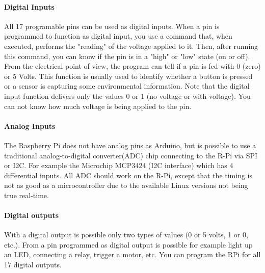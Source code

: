 \documentclass{acm_proc_article-sp}
\begin{document}
\paragraph{Digital Inputs}
All 17 programable pins can be used as digital inputs. When a pin is programmed to function as digital input, you use a command that, when executed, performs the "reading" of the voltage applied to it. Then, after running this command, you can know if the pin is in a "high" or "low" state (on or off).
\newline
\newline
From the electrical point of view, the program can tell if a pin is fed with 0 (zero) or 5 Volts. This function is usually used to identify whether a button is pressed or a sensor is capturing some environmental information. Note that the digital input function delivers only the values 0 or 1 (no voltage or with voltage). You can not know how much voltage is being applied to the pin.


\paragraph{Analog Inputs}
The Raspberry Pi does not have analog pins as Arduino, but is possible to use a traditional analog-to-digital converter(ADC) chip connecting to the R-Pi via SPI or I2C. For example the Microchip MCP3424 (I2C interface) which has 4 differential inputs. All ADC should work on the R-Pi, except that the timing is not as good as a microcontroller due to the available Linux versions not being true real-time. 

\paragraph{Digital outputs}
With a digital output is possible only two types of values (0 or 5 volts, 1 or 0, etc.). From a pin programmed as digital output is possible for example light up an LED, connecting a relay, trigger a motor, etc. You can program the RPi for all 17 digital outputs.
\end{document}
